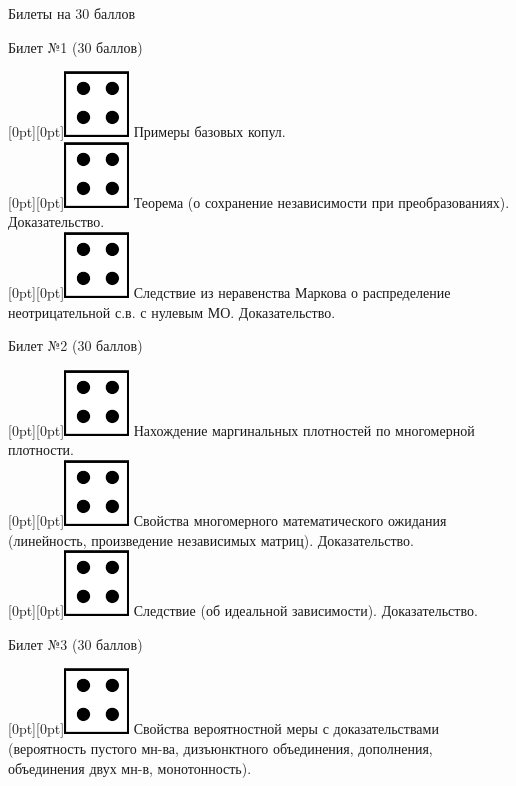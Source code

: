 \documentclass[10pt]{article}
\begin{document}
\begin{center}
    Билеты на 30 баллов
\end{center}


\begin{center} {\Large Билет №1 (30 баллов)} \end{center}
\raisebox{-1pt}[0pt][0pt]{\includegraphics[width=0.02\linewidth]{4.png}} Примеры базовых копул. \\
\raisebox{-1pt}[0pt][0pt]{\includegraphics[width=0.02\linewidth]{4.png}} Теорема (о сохранение независимости при преобразованиях). Доказательство. \\ 
\raisebox{-1pt}[0pt][0pt]{\includegraphics[width=0.02\linewidth]{4.png}} Следствие из неравенства Маркова о распределение неотрицательной с.в. с нулевым МО. Доказательство. \\
\begin{center} {\Large Билет №2 (30 баллов)} \end{center}
\raisebox{-1pt}[0pt][0pt]{\includegraphics[width=0.02\linewidth]{4.png}} Нахождение маргинальных плотностей по многомерной плотности. \\
\raisebox{-1pt}[0pt][0pt]{\includegraphics[width=0.02\linewidth]{4.png}} Свойства многомерного математического ожидания (линейность, произведение независимых матриц). Доказательство. \\ 
\raisebox{-1pt}[0pt][0pt]{\includegraphics[width=0.02\linewidth]{4.png}} Следствие (об идеальной зависимости). Доказательство. \\
\begin{center} {\Large Билет №3 (30 баллов)} \end{center}
\raisebox{-1pt}[0pt][0pt]{\includegraphics[width=0.02\linewidth]{4.png}} Свойства вероятностной меры с доказательствами (вероятность пустого мн-ва, дизъюнктного объединения, дополнения, объединения двух мн-в, монотонность). \\
\end{document}
